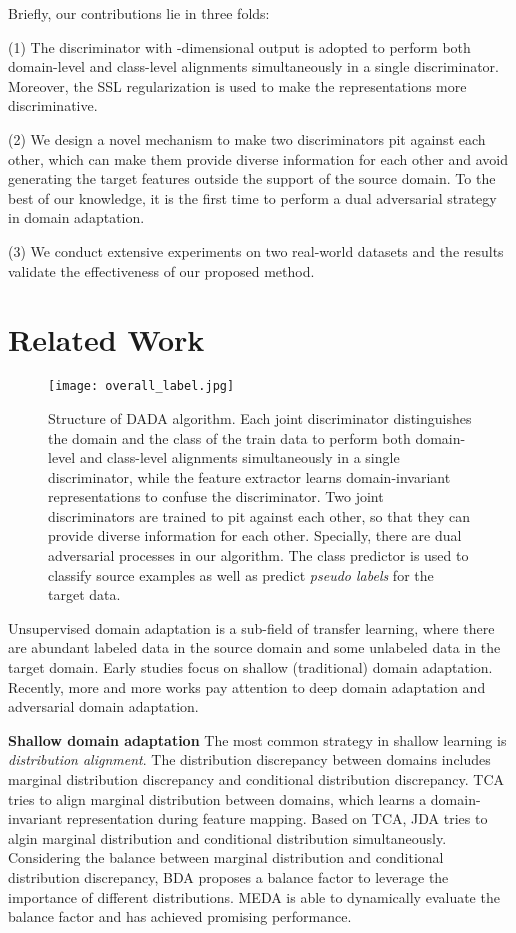 \documentclass{ecai}
\begin{document}
Briefly, our contributions lie in three folds:

(1) The discriminator with -dimensional output is adopted to perform both domain-level and class-level alignments simultaneously in a single discriminator. Moreover, the SSL regularization is used to make the representations more discriminative.

(2) We design a novel mechanism to make two discriminators pit against each other, which can make them provide diverse information for each other and avoid generating the target features outside the support of the source domain. To the best of our knowledge, it is the first time to perform a dual adversarial strategy in domain adaptation.

(3) We conduct extensive experiments on two real-world datasets  and the results validate the effectiveness of our proposed method.


\section{Related Work}


\begin{figure*}[htbp]
\begin{center}
\texttt{[image: overall\_label.jpg]}
\end{center}
\caption{ Structure of DADA algorithm. Each joint discriminator distinguishes the domain and the class of the train data to perform both domain-level and class-level alignments simultaneously in a single discriminator, while the feature extractor learns domain-invariant representations to confuse the discriminator. Two  joint discriminators are trained to pit against each other, so that they can provide diverse information for each other. Specially, there are dual adversarial processes in our algorithm. The class predictor is used to classify source examples as well as predict {\emph{pseudo labels}} for the target data.}
\label{network}
\end{figure*}

Unsupervised domain adaptation is a sub-field of transfer learning, where there are abundant labeled data in the source domain and some unlabeled data in the target domain.  Early studies focus on shallow (traditional) domain adaptation. Recently, more and more works pay attention to deep domain adaptation and adversarial domain adaptation.

\textbf{Shallow domain adaptation} The most common strategy in shallow learning is {\emph{distribution alignment}}. The distribution discrepancy between domains includes marginal distribution discrepancy and conditional distribution discrepancy. TCA\cite{b4} tries to align marginal distribution between domains, which learns a domain-invariant representation during feature mapping. Based on TCA, JDA\cite{b5} tries to algin marginal distribution and conditional distribution simultaneously. Considering the balance between marginal distribution and conditional distribution discrepancy, BDA\cite{b7} proposes a balance factor to leverage the importance of different distributions. MEDA\cite{b22} is able to dynamically evaluate the balance factor and has achieved promising performance.
\end{document}
